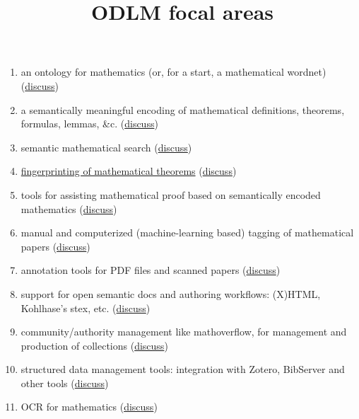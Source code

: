 \documentclass{article}
\begin{document}
\title{ODLM focal areas}

\maketitle

\begin{enumerate}
\renewcommand{\theenumi}{\Alph{enumi}}
\item\label{ontology} an ontology for mathematics (or, for a start, a mathematical wordnet) (\href{https://github.com/holtzermann17/skelodml/wiki/A.-An-ontology-for-mathematics}{discuss})
\item\label{encoding} a semantically meaningful encoding of mathematical definitions, theorems, formulas, lemmas, \&c. (\href{https://github.com/holtzermann17/skelodml/wiki/B.-Semantically-meaningful-encodings-of-mathematical-objects}{discuss})
\item\label{search} semantic mathematical search (\href{https://github.com/holtzermann17/skelodml/wiki/C.-Semantic-mathematical-search}{discuss})
\item\label{fingerprinting} \href{http://www.ams.org/notices/201308/rnoti-p1034.pdf}{fingerprinting of mathematical theorems} (\href{https://github.com/holtzermann17/skelodml/wiki/D.-Fingerprinting-of-mathematical-theorems}{discuss})
\item\label{proof} tools for assisting mathematical proof based on semantically encoded mathematics (\href{https://github.com/holtzermann17/skelodml/wiki/E.-Tools-for-assisting-mathematical-proof}{discuss})
\item\label{tagging} manual and computerized (machine-learning based) tagging of mathematical papers (\href{https://github.com/holtzermann17/skelodml/wiki/F.-(semi)automated-tagging-of-mathematical-papers}{discuss})
\item\label{annotation} annotation tools for PDF files and scanned papers (\href{https://github.com/holtzermann17/skelodml/wiki/G.-annotation-tools-for-PDF-files}{discuss})
\item\label{authoring} support for open semantic docs and authoring workflows: (X)HTML, Kohlhase's stex, etc. (\href{https://github.com/holtzermann17/skelodml/wiki/H.-Open-semantic-docs-and-authoring-workflows}{discuss})
\item\label{community} community/authority management like mathoverflow, for management and production of collections (\href{https://github.com/holtzermann17/skelodml/wiki/I.-community-and-authority-management-tools}{discuss})
\item\label{data} structured data management tools: integration with Zotero, BibServer and other tools (\href{https://github.com/holtzermann17/skelodml/wiki/J.-structured-data-management-tools}{discuss})
\item\label{ocr} OCR for mathematics (\href{https://github.com/holtzermann17/skelodml/wiki/K.-OCR-for-mathematics}{discuss})
\end{enumerate}
\end{document}
